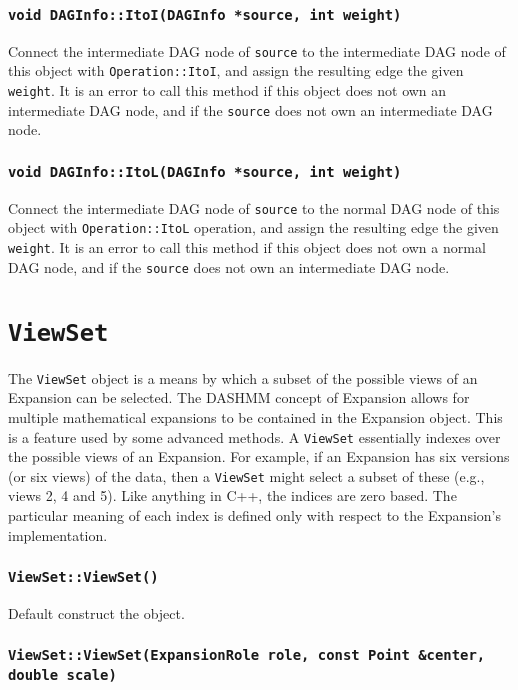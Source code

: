 \subsubsection{\texttt{void DAGInfo::ItoI(DAGInfo *source, int weight)}}

Connect the intermediate DAG node of \texttt{source} to the intermediate DAG
node of this object with \texttt{Operation::ItoI}, and assign the resulting
edge the given \texttt{weight}. It is an error to call this method if this
object does not own an intermediate DAG node, and if the \texttt{source} does
not own an intermediate DAG node.

\subsubsection{\texttt{void DAGInfo::ItoL(DAGInfo *source, int weight)}}

Connect the intermediate DAG node of \texttt{source} to the normal DAG node of
this object with \texttt{Operation::ItoL} operation, and assign the resulting
edge the given \texttt{weight}. It is an error to call this method if this
object does not own a normal DAG node, and if the \texttt{source} does
not own an intermediate DAG node.



\section{\texttt{ViewSet}}

The \texttt{ViewSet} object is a means by which a subset of the possible views
of an Expansion can be selected. The DASHMM concept of Expansion allows for
multiple mathematical expansions to be contained in the Expansion object. This
is a feature used by some advanced methods. A \texttt{ViewSet} essentially
indexes over the possible views of an Expansion. For example, if an
Expansion has six versions (or six views) of the data, then a \texttt{ViewSet}
might select a subset of these (e.g., views 2, 4 and 5). Like anything in C++,
the indices are zero based. The particular meaning of each index is defined
only with respect to the Expansion's implementation.

\subsubsection{\texttt{ViewSet::ViewSet()}}

Default construct the object.

\subsubsection{\texttt{ViewSet::ViewSet(ExpansionRole role, const Point \&center, double scale)}}

